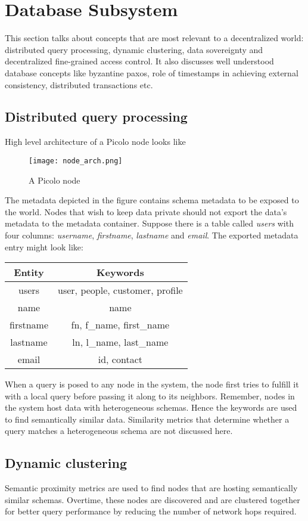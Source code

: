 \section{Database Subsystem}
This section talks about concepts that are most relevant to a decentralized world: distributed query processing, dynamic clustering, data sovereignty and decentralized fine-grained access control. It also discusses well understood database concepts like byzantine paxos, role of timestamps in achieving external consistency, distributed transactions etc.
\subsection{Distributed query processing} High level architecture of a Picolo node looks like 
\begin{figure}[h!] \centering
	\texttt{[image: node\_arch.png]}
	\caption{A Picolo node}
	\label{fig:node_arch}
\end{figure}
The metadata depicted in the figure contains schema metadata to be exposed to the world. Nodes that wish to keep data private should not export the data's metadata to the metadata container. Suppose there is a table called \textit{users} with four columns: \textit{username}, \textit{firstname}, \textit{lastname} and \textit{email}. The exported metadata entry might look like:
\begin{center}
	\begin{tabular}{| c | c |} 
		\hline
		Entity & Keywords \\ [0.5ex] 
		\hline
		users & user, people, customer, profile\\ 
		\hline
		name & name \\
		\hline
		firstname & fn, {f\_name}, {first\_name} \\
		\hline
		lastname & ln, {l\_name}, {last\_name} \\
		\hline
		email & id, contact \\ [1ex] 
		\hline
	\end{tabular}
\end{center}
When a query is posed to any node in the system, the node first tries to fulfill it with a local query before passing it along to its neighbors. Remember, nodes in the system host data with heterogeneous schemas. Hence the keywords are used to find semantically similar data. Similarity metrics that determine whether a query matches a heterogeneous schema are not discussed here.
\subsection{Dynamic clustering} \label{sec:dynamic_cluster}
Semantic proximity metrics are used to find nodes that are hosting semantically similar schemas. Overtime, these nodes are discovered and are clustered together for better query performance by reducing the number of network hops required.

